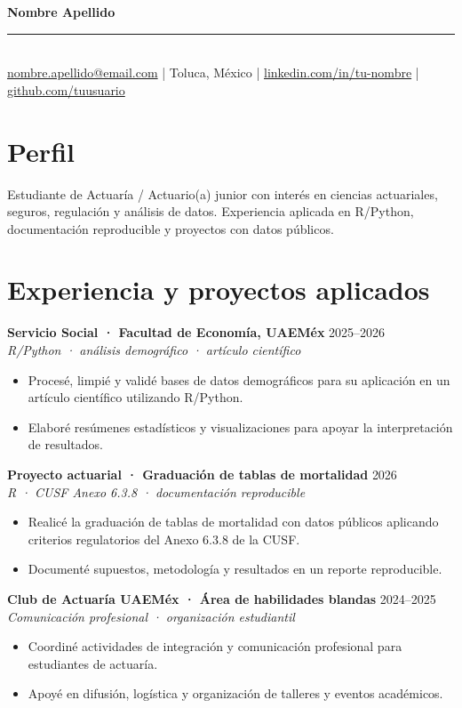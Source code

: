 \documentclass[10pt,letterpaper]{article}
\newcommand{\role}[4]{
  \textbf{#1} \hfill {\color{softgray} #2}\\
  \textit{#3}\\[-2pt]
  #4\vspace{3pt}
}
\begin{document}
{\Huge \textbf{Nombre Apellido}}\\[-1pt]
{\color{sage}\rule{\textwidth}{1.2pt}}\\[3pt]
\href{mailto:nombre.apellido@email.com}{nombre.apellido@email.com} \; | \; Toluca, México \; | \; \href{https://linkedin.com/in/tu-nombre}{linkedin.com/in/tu-nombre} \; | \; \href{https://github.com/tuusuario}{github.com/tuusuario}

\section*{Perfil}
Estudiante de Actuaría / Actuario(a) junior con interés en ciencias actuariales, seguros, regulación y análisis de datos. Experiencia aplicada en R/Python, documentación reproducible y proyectos con datos públicos.

\section*{Experiencia y proyectos aplicados}
\role{Servicio Social · Facultad de Economía, UAEMéx}{2025--2026}{R/Python · análisis demográfico · artículo científico}{
\begin{itemize}
  \item Procesé, limpié y validé bases de datos demográficos para su aplicación en un artículo científico utilizando R/Python.
  \item Elaboré resúmenes estadísticos y visualizaciones para apoyar la interpretación de resultados.
\end{itemize}}

\role{Proyecto actuarial · Graduación de tablas de mortalidad}{2026}{R · CUSF Anexo 6.3.8 · documentación reproducible}{
\begin{itemize}
  \item Realicé la graduación de tablas de mortalidad con datos públicos aplicando criterios regulatorios del Anexo 6.3.8 de la CUSF.
  \item Documenté supuestos, metodología y resultados en un reporte reproducible.
\end{itemize}}

\role{Club de Actuaría UAEMéx · Área de habilidades blandas}{2024--2025}{Comunicación profesional · organización estudiantil}{
\begin{itemize}
  \item Coordiné actividades de integración y comunicación profesional para estudiantes de actuaría.
  \item Apoyé en difusión, logística y organización de talleres y eventos académicos.
\end{itemize}}
\end{document}
